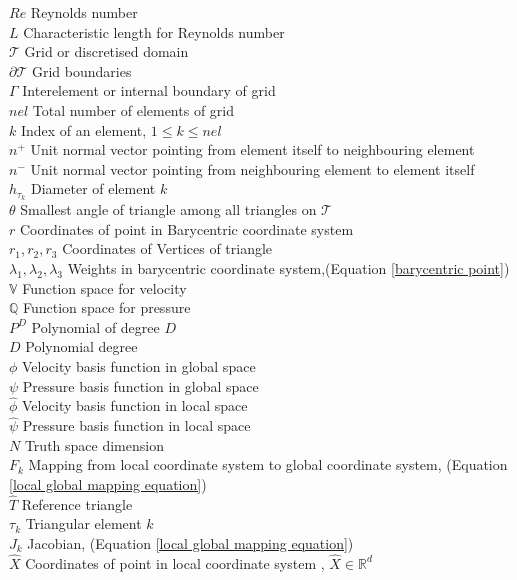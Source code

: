 \documentclass[a4paper,12pt]{book}
\begin{document}
$Re$ Reynolds number\\
$L$ Characteristic length for Reynolds number\\
$\mathcal{T}$ Grid or discretised domain\\
$\partial \mathcal{T}$ Grid boundaries\\
$\Gamma$ Interelement or internal boundary of grid\\
$nel$ Total number of elements of grid\\
$k$ Index of an element, $1\leq k \leq nel$\\
$n^+$ Unit normal vector pointing from element itself to neighbouring element\\
$n^-$ Unit normal vector pointing from neighbouring element to element itself\\
$h_{\tau_k}$ Diameter of element $k$\\
$\theta$ Smallest angle of triangle among all triangles on $\mathcal{T}$\\ 
$r$ Coordinates of point in Barycentric coordinate system\\
$r_1, r_2, r_3$ Coordinates of Vertices of triangle\\
$\lambda_1, \lambda_2, \lambda_3$ Weights in barycentric coordinate system,(Equation \ref{barycentric point})\\
$\mathbb{V}$ Function space for velocity\\
$\mathbb{Q}$ Function space for pressure\\
$P^D$ Polynomial of degree $D$\\
$D$ Polynomial degree\\
$\phi$ Velocity basis function in global space\\
$\psi$ Pressure basis function in global space\\
$\hat{\phi}$ Velocity basis function in local space\\
$\hat{\psi}$ Pressure basis function in local space\\
$N$ Truth space dimension\\
$F_k$ Mapping from local coordinate system to global coordinate system, (Equation \ref{local global mapping equation})\\
$\hat{T}$ Reference triangle\\
$\tau_k$ Triangular element $k$\\
$J_k$ Jacobian, (Equation \ref{local global mapping equation})\\
$\hat{X}$ Coordinates of point in local coordinate system , $\hat{X} \in \mathbb{R}^d$\\
\end{document}

